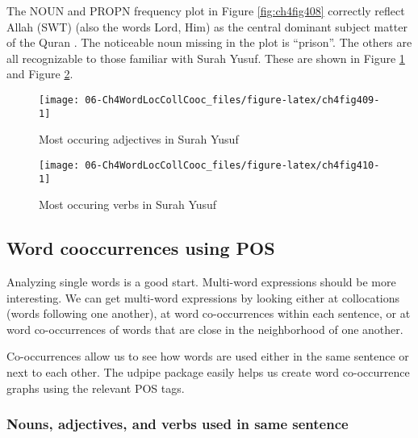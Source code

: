 \documentclass[
]{article}
\begin{document}
The NOUN and PROPN frequency plot in Figure \ref{fig:ch4fig408} correctly reflect Allah (SWT) (also the words Lord, Him) as the central dominant subject matter of the Quran \citep{alsuwaidan2021}. The noticeable noun missing in the plot is ``prison''. The others are all recognizable to those familiar with Surah Yusuf. These are shown in Figure \ref{fig:ch4fig409} and Figure \ref{fig:ch4fig410}.

\begin{figure}

{\centering \texttt{[image: 06-Ch4WordLocCollCooc\_files/figure-latex/ch4fig409-1]} 

}

\caption{Most occuring adjectives in Surah Yusuf}\label{fig:ch4fig409}
\end{figure}

\begin{figure}

{\centering \texttt{[image: 06-Ch4WordLocCollCooc\_files/figure-latex/ch4fig410-1]} 

}

\caption{Most occuring verbs in Surah Yusuf}\label{fig:ch4fig410}
\end{figure}

\hypertarget{word-cooccurrences-using-POS}{%
\subsection{Word cooccurrences using POS}\label{word-cooccurrences-using-POS}}

Analyzing single words is a good start. Multi-word expressions should be more interesting. We can get multi-word expressions by looking either at collocations (words following one another), at word co-occurrences within each sentence, or at word co-occurrences of words that are close in the neighborhood of one another.

Co-occurrences allow us to see how words are used either in the same sentence or next to each other. The udpipe package easily helps us create word co-occurrence graphs using the relevant POS tags.

\hypertarget{nouns-adjectives-and-verbs-used-in-same-sentence}{%
\subsubsection{Nouns, adjectives, and verbs used in same sentence}\label{nouns-adjectives-and-verbs-used-in-same-sentence}}
\end{document}
